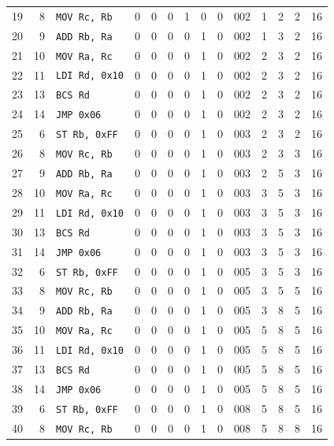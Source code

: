 \begin{longtable}{rrlcccccc r rrrr}
19 & 8 & \texttt{MOV Rc, Rb} & 0 & 0 & 0 & 1 & 0 & 0 & 002 & 1 & 2 & 2 & 16 \\
20 & 9 & \texttt{ADD Rb, Ra} & 0 & 0 & 0 & 0 & 1 & 0 & 002 & 1 & 3 & 2 & 16 \\
21 & 10 & \texttt{MOV Ra, Rc} & 0 & 0 & 0 & 0 & 1 & 0 & 002 & 2 & 3 & 2 & 16 \\
22 & 11 & \texttt{LDI Rd, 0x10} & 0 & 0 & 0 & 0 & 1 & 0 & 002 & 2 & 3 & 2 & 16 \\
23 & 13 & \texttt{BCS Rd} & 0 & 0 & 0 & 0 & 1 & 0 & 002 & 2 & 3 & 2 & 16 \\
24 & 14 & \texttt{JMP 0x06} & 0 & 0 & 0 & 0 & 1 & 0 & 002 & 2 & 3 & 2 & 16 \\
25 & 6 & \texttt{ST Rb, 0xFF} & 0 & 0 & 0 & 0 & 1 & 0 & 003 & 2 & 3 & 2 & 16 \\
26 & 8 & \texttt{MOV Rc, Rb} & 0 & 0 & 0 & 0 & 1 & 0 & 003 & 2 & 3 & 3 & 16 \\
27 & 9 & \texttt{ADD Rb, Ra} & 0 & 0 & 0 & 0 & 1 & 0 & 003 & 2 & 5 & 3 & 16 \\
28 & 10 & \texttt{MOV Ra, Rc} & 0 & 0 & 0 & 0 & 1 & 0 & 003 & 3 & 5 & 3 & 16 \\
29 & 11 & \texttt{LDI Rd, 0x10} & 0 & 0 & 0 & 0 & 1 & 0 & 003 & 3 & 5 & 3 & 16 \\
30 & 13 & \texttt{BCS Rd} & 0 & 0 & 0 & 0 & 1 & 0 & 003 & 3 & 5 & 3 & 16 \\
31 & 14 & \texttt{JMP 0x06} & 0 & 0 & 0 & 0 & 1 & 0 & 003 & 3 & 5 & 3 & 16 \\
32 & 6 & \texttt{ST Rb, 0xFF} & 0 & 0 & 0 & 0 & 1 & 0 & 005 & 3 & 5 & 3 & 16 \\
33 & 8 & \texttt{MOV Rc, Rb} & 0 & 0 & 0 & 0 & 1 & 0 & 005 & 3 & 5 & 5 & 16 \\
34 & 9 & \texttt{ADD Rb, Ra} & 0 & 0 & 0 & 0 & 1 & 0 & 005 & 3 & 8 & 5 & 16 \\
35 & 10 & \texttt{MOV Ra, Rc} & 0 & 0 & 0 & 0 & 1 & 0 & 005 & 5 & 8 & 5 & 16 \\
36 & 11 & \texttt{LDI Rd, 0x10} & 0 & 0 & 0 & 0 & 1 & 0 & 005 & 5 & 8 & 5 & 16 \\
37 & 13 & \texttt{BCS Rd} & 0 & 0 & 0 & 0 & 1 & 0 & 005 & 5 & 8 & 5 & 16 \\
38 & 14 & \texttt{JMP 0x06} & 0 & 0 & 0 & 0 & 1 & 0 & 005 & 5 & 8 & 5 & 16 \\
39 & 6 & \texttt{ST Rb, 0xFF} & 0 & 0 & 0 & 0 & 1 & 0 & 008 & 5 & 8 & 5 & 16 \\
40 & 8 & \texttt{MOV Rc, Rb} & 0 & 0 & 0 & 0 & 1 & 0 & 008 & 5 & 8 & 8 & 16 \\

\end{longtable}
